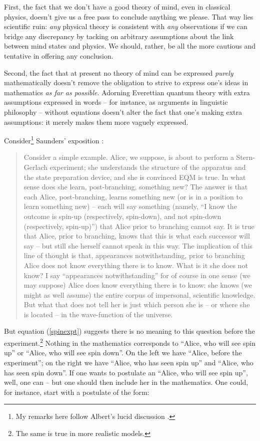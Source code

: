 \documentclass[aps,
pra,epsfig,12pt]{revtex4}
\begin{document}
First, the fact that we don't 
have a good theory of mind, even in classical physics, doesn't give 
us a free pass to conclude anything we please.   That way lies 
scientific ruin: {\it any} physical theory is consistent with
{\it any} observations if we can bridge any discrepancy 
by tacking on arbitrary assumptions about the link between mind 
states and physics.   We should, rather, be 
all the more cautious and tentative in offering any conclusion.  

Second, the fact that at present no theory of mind can be expressed {\it purely}
mathematically doesn't remove the obligation to strive to express
one's ideas in mathematics {\it as far as possible}.   
Adorning Everettian quantum theory 
with extra assumptions expressed in words -- for instance, as arguments in
linguistic philosophy -- without equations doesn't
alter the fact that one's making extra assumptions: it merely makes 
them more vaguely expressed.  

Consider\footnote{My remarks here follow
Albert's lucid discussion \cite{albertvol}.}
Saunders' exposition \cite{saundersvol}:

\begin{quotation}
Consider a simple example. Alice, we suppose, is about
to perform a Stern-Gerlach experiment; she understands the structure of the
apparatus and the state preparation device, and she is convinced EQM is true.
In what sense does she learn, post-branching, something new? The answer is
that each Alice, post-branching, learns something new (or is in a position to
learn something new) -- each will say something (namely, ``I know the outcome
is spin-up (respectively, spin-down), and not spin-down 
(respectively, spin-up)'') that Alice prior to branching cannot say. 
It is true that Alice, prior to branching, 
knows that this is what each successor will say -- but 
still she herself cannot speak
in this way.
The implication of this line of thought is that, appearances notwithstanding,
prior to branching Alice does not know everything there is to know. What is it
she does not know? I say ``appearances notwithstanding'' for of course in one
sense (we may suppose) Alice does know everything there is to know: she knows
(we might as well assume) the entire corpus of impersonal, scientific knowledge.
But what that does not tell her is just which person she is -- 
or where she is located -- in the wave-function of the universe.
\end{quotation}

But equation (\ref{spinexpt}) suggests there is
no meaning to this question before the 
experiment.\footnote{The same is true in more realistic
models.}
Nothing in the mathematics corresponds to ``Alice, 
who will see spin up'' or ``Alice, who will
see spin down''.  On the left we have  
``Alice, before the experiment''; on the right we have 
``Alice, who has seen spin up'' and ``Alice, who has seen spin down''. 
If one wants to postulate an ``Alice, who will see spin up'', well, 
one can -- but one should then include her in 
the mathematics.
One could, for instance, start with a postulate of the form:
\end{document}
